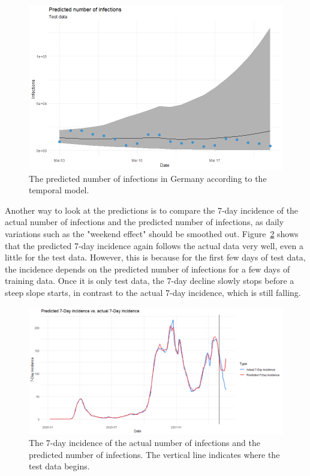 \clearpage
\begin{figure}[H]
  \centering
  \includegraphics[width = \textwidth]{predictions_2_germany.png}
  \caption{The predicted number of infections in Germany according to the temporal model.}
  \label{predictions_2_germany}
\end{figure}
Another way to look at the predictions is to compare the 7-day incidence of the actual number of infections and the predicted number of infections, as daily variations such as the "weekend effect" should be smoothed out. Figure~\ref{incidence_germany} shows that the predicted 7-day incidence again follows the actual data very well, even a little for the test data. However, this is because for the first few days of test data, the incidence depends on the predicted number of infections for a few days of training data. Once it is only test data, the 7-day decline slowly stops before a steep slope starts, in contrast to the actual 7-day incidence, which is still falling. \clearpage
\begin{figure}[H]
  \centering
  \includegraphics[width = \textwidth]{incidence_germany.png}  
  \caption{The 7-day incidence of the actual number of infections and the predicted number of infections. The vertical line indicates where the test data begins.}
  \label{incidence_germany}
\end{figure}
